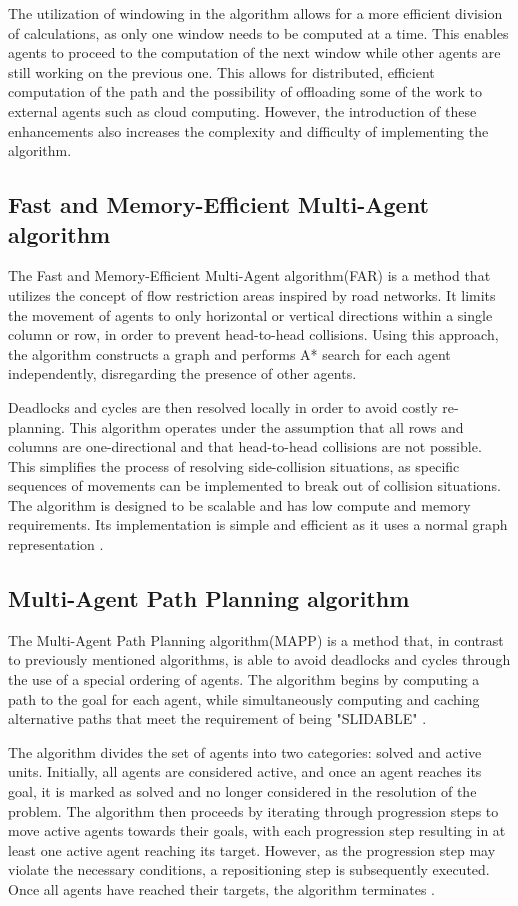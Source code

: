 The utilization of windowing in the algorithm allows for a more efficient division of calculations, as only one window needs to be computed at a time. This enables agents to proceed to the computation of the next window while other agents are still working on the previous one. This allows for distributed, efficient computation of the path and the possibility of offloading some of the work to external agents such as cloud computing. However, the introduction of these enhancements also increases the complexity and difficulty of implementing the algorithm.


\subsection{Fast and Memory-Efficient Multi-Agent algorithm}
The Fast and Memory-Efficient Multi-Agent algorithm(FAR) is a method that utilizes the concept of flow restriction areas inspired by road networks. It limits the movement of agents to only horizontal or vertical directions within a single column or row, in order to prevent head-to-head collisions. Using this approach, the algorithm constructs a graph and performs A* search for each agent independently, disregarding the presence of other agents.

Deadlocks and cycles are then resolved locally in order to avoid costly re-planning. This algorithm operates under the assumption that all rows and columns are one-directional and that head-to-head collisions are not possible. This simplifies the process of resolving side-collision situations, as specific sequences of movements can be implemented to break out of collision situations. The algorithm is designed to be scalable and has low compute and memory requirements. Its implementation is simple and efficient as it uses a normal graph representation \cite{far}.

\subsection{Multi-Agent Path Planning algorithm}
The Multi-Agent Path Planning algorithm(MAPP) is a method that, in contrast to previously mentioned algorithms, is able to avoid deadlocks and cycles through the use of a special ordering of agents. The algorithm begins by computing a path to the goal for each agent, while simultaneously computing and caching alternative paths that meet the requirement of being "SLIDABLE" \cite{mapp_algo}. 

The algorithm divides the set of agents into two categories: solved and active units. Initially, all agents are considered active, and once an agent reaches its goal, it is marked as solved and no longer considered in the resolution of the problem. The algorithm then proceeds by iterating through progression steps to move active agents towards their goals, with each progression step resulting in at least one active agent reaching its target. However, as the progression step may violate the necessary conditions, a repositioning step is subsequently executed. Once all agents have reached their targets, the algorithm terminates \cite{mapp_algo}.